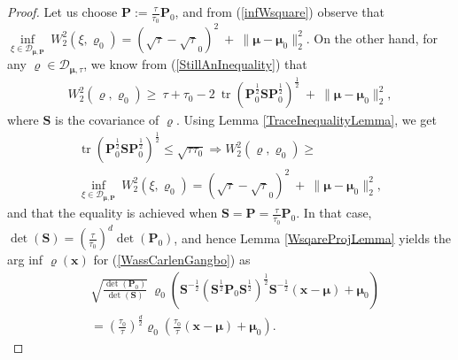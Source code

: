 \documentclass[letterpaper,10pt,twocolumn,conference]{ieeeconf}
\newcommand{\cD}{{\mathscr{D}}}
\newcommand{\tr}{\operatorname{tr}}
\begin{document}
\begin{proof}
Let us choose $\bm{P}:=\frac{\tau}{\tau_{0}}\bm{P}_{0}$, and from (\ref{infWsquare}) observe that $\underset{\xi\in\cD_{\bm{\mu},\bm{P}}}{\inf}\: W_{2}^{2}\left(\xi,\varrho_{0}\right) = \left(\sqrt{\tau} - \sqrt{\tau}_{0}\right)^{2} \: + \: \parallel \bm{\mu} - \bm{\mu}_{0} \parallel_{2}^{2}$.	On the other hand, for any $\varrho\in \cD_{\bm{\mu},\tau}$, we know from (\ref{StillAnInequality}) that 
\begin{eqnarray*}
W_{2}^{2}\left(\varrho,\varrho_{0}\right) \geq \: \tau + \tau_{0} - 2\:\tr\left(\bm{P}_{0}^{\frac{1}{2}} \bm{S} \bm{P}_{0}^{\frac{1}{2}}\right)^{\frac{1}{2}} \: + \: \parallel \bm{\mu} - \bm{\mu}_{0} \parallel_{2}^{2},
\end{eqnarray*}
where $\bm{S}$ is the covariance of $\varrho$. Using Lemma \ref{TraceInequalityLemma}, we get
\begin{eqnarray}
\tr\left(\bm{P}_{0}^{\frac{1}{2}} \bm{S} \bm{P}_{0}^{\frac{1}{2}}\right)^{\frac{1}{2}} \leq \sqrt{\tau \tau_{0}} \Rightarrow W_{2}^{2}\left(\varrho,\varrho_{0}\right) \geq \nonumber\\
\underset{\xi\in\cD_{\bm{\mu},\bm{P}}}{\inf}\: W_{2}^{2}\left(\xi,\varrho_{0}\right) = \left(\sqrt{\tau} - \sqrt{\tau}_{0}\right)^{2} \: + \: \parallel \bm{\mu} - \bm{\mu}_{0} \parallel_{2}^{2},
\label{CorollaryFinal}	
\end{eqnarray}
and that the equality is achieved when $\bm{S} = \bm{P} = \frac{\tau}{\tau_{0}}\bm{P}_{0}$. In that case, $\det(\bm{S})=\left(\frac{\tau}{\tau_{0}}\right)^{d}\det(\bm{P}_{0})$, and hence Lemma \ref{WsqareProjLemma} yields the arg inf $\varrho(\bm{x})$ for (\ref{WassCarlenGangbo}) as
 \begin{align*}
&\sqrt{\frac{\det(\bm{P}_{0})}{\det(\bm{S})}}\:\varrho_{0}\left(\bm{S}^{-\frac{1}{2}} \left(\bm{S}^{\frac{1}{2}}\bm{P}_{0}\bm{S}^{\frac{1}{2}}\right)^{\frac{1}{2}} \bm{S}^{-\frac{1}{2}}\left(\bm{x} - \bm{\mu}\right) + \bm{\mu}_{0}\right) \\
&= \left(\frac{\tau_{0}}{\tau}\right)^{\frac{d}{2}} \varrho_{0}\left(\frac{\tau_{0}}{\tau}\left(\bm{x} - \bm{\mu}\right) + \bm{\mu}_{0}\right).
 \end{align*}
\vspace*{-0.1in} 
\end{proof}
\end{document}
